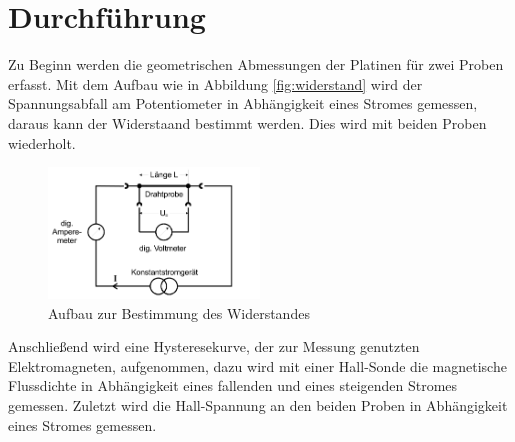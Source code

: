 \section{Durchführung}
\label{sec:Durchführung}
Zu Beginn werden die geometrischen Abmessungen der Platinen für zwei Proben erfasst.
Mit dem Aufbau wie in Abbildung \ref{fig:widerstand} wird der Spannungsabfall am Potentiometer in Abhängigkeit eines Stromes gemessen, daraus kann
der Widerstaand bestimmt werden. Dies wird mit beiden Proben wiederholt.
\begin{figure}
  \centering
  \includegraphics[width=0.5\textwidth]{widerstand.PNG}
  \caption{Aufbau zur Bestimmung des Widerstandes}
  \label{fig:widerstang}
\end{figure}

Anschließend wird eine Hysteresekurve, der zur Messung genutzten Elektromagneten, aufgenommen, dazu wird mit einer Hall-Sonde die magnetische Flussdichte in Abhängigkeit
eines fallenden und eines steigenden Stromes gemessen.
Zuletzt wird die Hall-Spannung an den beiden Proben in Abhängigkeit eines Stromes gemessen.
